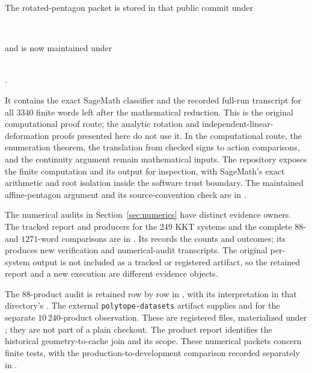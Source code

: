 The rotated-pentagon packet is stored in that public commit under
\begin{center}
  \small{}\\[-0.2em]
\end{center}
and is now maintained under
\begin{center}
  \small{}\\[-0.2em]
  .
\end{center}
It contains the exact SageMath classifier and the recorded full-run transcript
for all \(3340\) finite words left after the mathematical reduction.  This is the original computational proof route; the analytic rotation and
independent-linear-deformation proofs presented here do not use it. In the
computational route, the enumeration theorem, the
translation from checked signs to action comparisons, and the continuity
argument remain mathematical inputs.  The repository exposes the finite
computation and its output for inspection, with SageMath's exact arithmetic
and root isolation inside the software trust boundary. The maintained
affine-pentagon argument and its source-convention check are in
.

The numerical audits in Section~\ref{sec:numerics} have distinct evidence owners.
The tracked report and producers for the \(249\) KKT systems and the complete
\(88\)- and \(1271\)-word comparisons are in
.
Its  records the counts and outcomes; its 
produces new verification and numerical-audit transcripts. The original
per-system output is not included as a tracked or registered artifact, so
the retained report and a new execution are different evidence objects.

The \(88\)-product audit is retained row by row in
,
with its interpretation in that directory's .
The external \texttt{polytope-datasets} artifact supplies
 and  for the separate
\(10\,240\)-product observation. These are registered files,
materialized under ; they are not part
of a plain checkout. The product report identifies the historical
geometry-to-cache join and its scope. These numerical packets concern finite
tests, with the production-to-development comparison recorded separately in
\newline{}.

